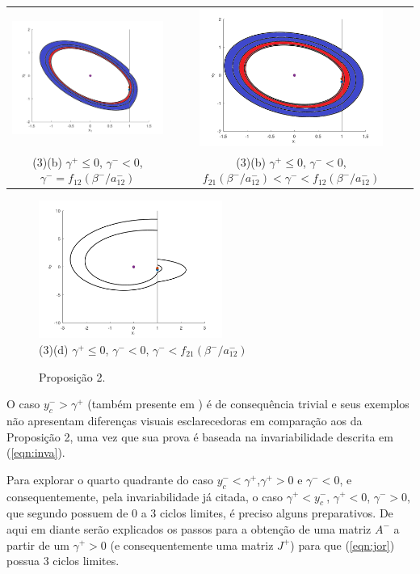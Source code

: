 \begin{table}[H]
\begin{tabular}{cc}
\includegraphics[width=6cm]{2_3_b_eq}
&
\includegraphics[width=6cm]{2_3_b_less}\\
\small(3)(b) $\gamma^+\leq0$, $\gamma^-<0$, $\gamma^-=f_{12}(\beta^-/a^-_{12})$&\small(3)(b) $\gamma^+\leq0$, $\gamma^-<0$, $f_{21}(\beta^-/a^-_{12})<\gamma^-<f_{12}(\beta^-/a^-_{12})$
\end{tabular}
\end{table}
\begin{figure}[H]
\centering
\begin{table}[H]
\centering
\includegraphics[width=6cm]{2_3_d}\\
\small(3)(d) $\gamma^+\leq0$, $\gamma^-<0$, $\gamma^-<f_{21}(\beta^-/a^-_{12})$
\end{table}
\caption{\label{prep2}Proposição 2.}
\end{figure}
O caso $y_c^->\gamma^+$ (também presente em \cite{Huan:etal:2012}) é de consequência trivial e seus exemplos não apresentam diferenças visuais esclarecedoras em comparação aos da Proposição 2, uma vez que sua prova é baseada na invariabilidade descrita em (\ref{eqn:inva}). 

Para explorar o quarto quadrante do caso $y_c^-<\gamma^+$,$\gamma^+>0$ e $\gamma^-<0$, e consequentemente, pela invariabilidade já citada, o caso $\gamma^+ < y_c^-$, $\gamma^+ < 0$, $\gamma^- > 0$,  	que segundo \cite{Huan:etal:2012} possuem de 0 a 3 ciclos limites, é preciso alguns preparativos. De aqui em diante serão explicados os passos para a obtenção de uma matriz $A^-$ a partir de um $\gamma^+>0$ (e consequentemente uma matriz $J^+$) para que (\ref{eqn:jor}) possua 3 ciclos limites. 

